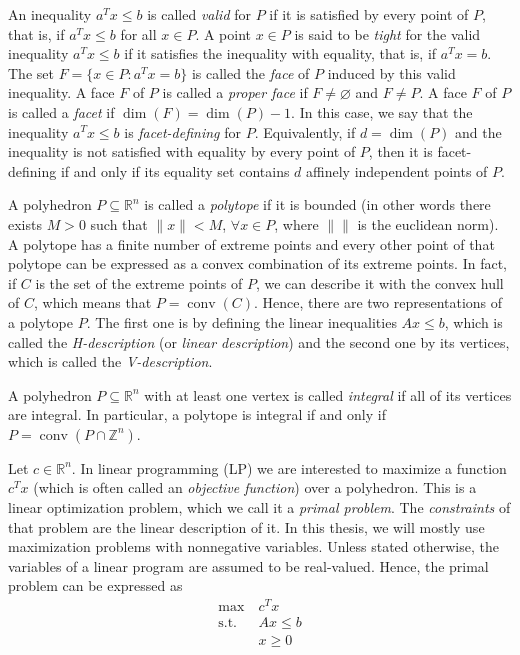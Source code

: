 \documentclass[12pt]{report}
\numberwithin{algorithm}{chapter}
\begin{document}
	An inequality $a^Tx \leq b$ is called \emph{valid} for $P$ if it is satisfied by every point of $P$, that is, if $a^Tx \leq b$ for all $x \in P$. A point $x\in P$ is said to be \emph{tight} for the valid inequality
	$a^Tx\leq b$ if it satisfies the inequality with equality, that is, if
	$a^Tx=b$. The set
	$F = \{x \in P : a^Tx = b\}$
	is called the \emph{face} of $P$ induced by this valid inequality. A face $F$ of $P$ is called a \emph{proper face} if
	$F\ne\varnothing$ and $F\ne P$.
	A face $F$ of $P$ is called a \emph{facet} if $\operatorname{dim}(F) = \operatorname{dim}(P) - 1.$
	In this case, we say that the inequality $a^Tx \leq b$ is \emph{facet-defining} for $P$. Equivalently, if $d = \operatorname{dim}(P)$ and the inequality is not satisfied with equality by every point of $P$, then it is facet-defining if and only if its equality set contains $d$ affinely independent points of $P$.
	
	A polyhedron $P \subseteq \mathbb{R}^{n}$ is called a \emph{polytope} if it is bounded (in other words there exists $M > 0$ such that $\|x\| < M$, $\forall x \in P$, where $\|\|$ is the euclidean norm). A polytope has a finite number of extreme points and every other point of that polytope can be expressed as a convex combination of its extreme points. In fact, if $C$ is the set of the extreme points of $P$, we can describe it with the convex hull of $C$, which means that $P = \operatorname{conv}(C)$. Hence, there are two representations of a polytope $P$. The first one is by defining the linear inequalities $Ax \leq b$, which is called the \emph{H-description} (or \emph{linear description}) and the second one by its vertices, which is called the \emph{V-description}.
	
	A polyhedron $P \subseteq \mathbb{R}^{n}$ with at least one vertex is called \emph{integral} if all of its vertices are integral. In particular, a polytope is integral if and only if
	$P = \operatorname{conv}(P \cap \mathbb{Z}^{n})$.
	
	Let $c \in \mathbb{R}^{n}$. In linear programming (LP) we are interested to maximize a function $c^{T}x$ (which is often called an \emph{objective function}) over a polyhedron. This is a linear optimization problem, which we call it a \emph{primal problem}. The \emph{constraints} of that problem are the linear description of it. In this thesis, we will mostly use maximization problems with nonnegative variables. Unless stated otherwise, the variables of a linear program are assumed to be real-valued. Hence, the primal problem can be expressed as
	\begin{equation} \label{3.1}
		\begin{aligned}
			\max \ & c^T x \\
			\text{s.t.} \ & Ax \leq b \\
			& x \geq 0
		\end{aligned}
	\end{equation}
	
\end{document}
